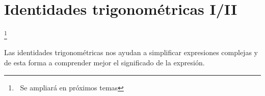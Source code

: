 \vspace{.5cm}
\section{Identidades trigonométricas I/II}
 \hspace{1cm} \footnote{$\ $ Se ampliará en próximos temas}
\vspace{0.5cm}

Las identidades trigonométricas nos ayudan a simplificar expresiones complejas y de esta forma a comprender mejor el significado de la expresión.

